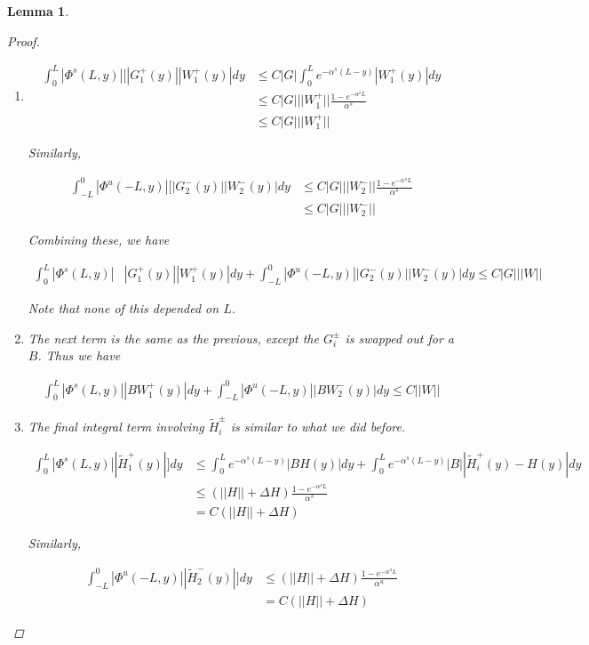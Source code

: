 \documentclass[12pt]{article}
\newtheorem{lemma}{Lemma}
\begin{document}
\begin{lemma}
\begin{proof}
\begin{enumerate}
\item
\begin{align*}
\int_0^L |\Phi^s(L, y)|[|G_1^+(y)||W_1^+(y)| dy &\leq C|G| \int_0^L e^{-\alpha^s(L-y)}|W_1^+(y)| dy \\
&\leq C|G|||W_1^+|| \frac{1 - e^{-\alpha^s L}}{\alpha^s} \\
&\leq C|G|||W_1^+||
\end{align*}

Similarly,

\begin{align*}
\int_{-L}^0 |\Phi^u(-L, y)|[|G_2^-(y)||W_2^-(y)| dy &\leq C|G|||W_2^-|| \frac{1 - e^{-\alpha^u L}}{\alpha^s} \\
&\leq C|G|||W_2^-||
\end{align*}

Combining these, we have

\begin{align*}
\int_0^L |\Phi^s(L, y)|&|G_1^+(y)||W_1^+(y)| dy + \int_{-L}^0 |\Phi^u(-L, y)||G_2^-(y)||W_2^-(y)| dy \leq C|G| ||W||
\end{align*}

Note that none of this depended on $L$.

\item The next term is the same as the previous, except the $G_i^\pm$ is swapped out for a $B$. Thus we have

\begin{align*}
\int_0^L |\Phi^s(L, y)||BW_1^+(y)| dy + \int_{-L}^0 |\Phi^u(-L, y)||BW_2^-(y)| dy \leq C ||W||
\end{align*}

\item The final integral term involving $\tilde{H}_i^\pm$ is similar to what we did before.

\begin{align*}
\int_0^L |\Phi^s(L, y)|| \tilde{H}_1^+(y)| ] dy &\leq \int_0^L e^{-\alpha^s (L - y)}|BH(y)| dy + \int_0^L e^{-\alpha^s (L - y)}|B||\tilde{H}_i^+(y) - H(y)| dy \\
&\leq (||H|| + \Delta H)\frac{1 - e^{-\alpha^s L}}{\alpha^s} \\
&= C( ||H|| + \Delta H )
\end{align*}

Similarly,

\begin{align*}
\int_{-L}^0 |\Phi^u(-L, y)||\tilde{H}_2^-(y)| ] dy &\leq (||H|| + \Delta H)\frac{1 - e^{-\alpha^u L}}{\alpha^u} \\
&= C( ||H|| + \Delta H )
\end{align*}


\end{enumerate}
\end{proof}
\end{lemma}
\end{document}
